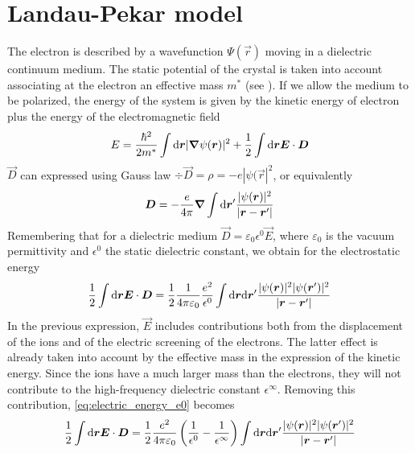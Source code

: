\section{Landau-Pekar model} \label{sec:landau_pekar}
The electron is described by a wavefunction $\Psi(\vec{r})$ moving in a dielectric continuum medium. The static potential of the crystal is taken into account associating at the electron an effective mass $m^*$ (see ). If we allow the medium to be polarized, the energy of the system is given by the kinetic energy of electron plus the energy of the electromagnetic field
\begin{equation} \label{eq:energy_landau}
    E = \frac{\hbar^2}{2m^*} \int \differential\vec{r} |\grad \psi(\vec{r})|^2 + \oh \int \differential \vec{r} \vec{E}\cdot \vec{D}
\end{equation}
$\vec{D}$ can expressed using Gauss law $\div\vec{D} = \rho = -e |\psi(\vec{r}|^2$, or equivalently
\begin{equation}
    \vec{D} = -\frac{e}{4\pi} \grad \int \differential \vec{r}' \frac{|\psi(\vec{r})|^2}{|\vec{r}-\vec{r}'|}
\end{equation}
Remembering that for a dielectric medium $\vec{D} = \varepsilon_0 \epsilon^0 \vec{E}$, where $\varepsilon_0$ is the vacuum permittivity and $\epsilon^0$ the static dielectric constant, we obtain for the electrostatic energy
\begin{equation} \label{eq:electric_energy_e0}
    \oh \int \differential \vec{r}  \vec{E}\cdot \vec{D} =
    \oh \frac{1}{4\pi\varepsilon_0} \frac{e^2}{\epsilon^0} \int \differential \vec{r} \differential \vec{r}' \frac{|\psi(\vec{r})|^2|\psi(\vec{r}')|^2}{|\vec{r}-\vec{r}'|}
\end{equation}
In the previous expression, $\vec{E}$ includes contributions both from the displacement of the ions and of the electric screening of the electrons. The latter effect is already taken into account by the effective mass in the expression of the kinetic energy. Since the ions have a much larger mass than the electrons, they will not contribute to the high-frequency dielectric constant $\epsilon^\infty$. Removing this contribution, \cref{eq:electric_energy_e0} becomes
\begin{equation}
    \oh \int \differential \vec{r} \vec{E}\cdot \vec{D} =
    \oh \frac{e^2}{4\pi\varepsilon_0} \left( \frac{1}{\epsilon^0} - \frac{1}{\epsilon^\infty} \right) \int \differential \vec{r} \differential \vec{r}' \frac{|\psi(\vec{r})|^2|\psi(\vec{r}')|^2}{|\vec{r}-\vec{r}'|}
\end{equation}
